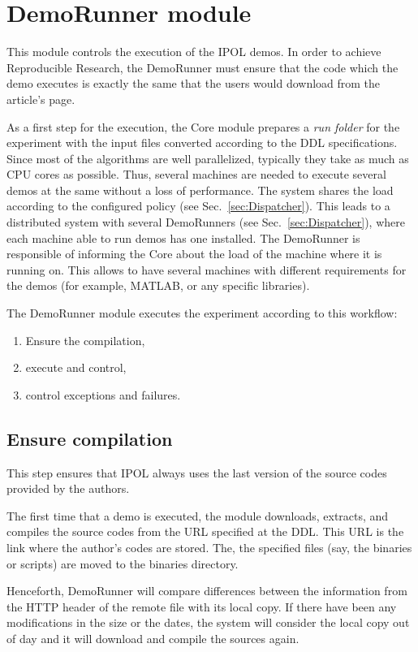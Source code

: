 \section{DemoRunner module}
\label{sec:DemoRunner}
This module controls the execution of the IPOL demos. In order to achieve Reproducible Research, the DemoRunner must ensure that the code which the demo executes is exactly the same that the users would download from the article's page.

As a first step for the execution, the Core module prepares a \emph{run folder} for the experiment with the input files converted according to the DDL specifications. Since most of the algorithms are well parallelized, typically they take as much as CPU cores as possible. Thus, several machines are needed to execute several demos at the same without a loss of performance. The system shares the load according to the configured policy (see Sec.~\ref{sec:Dispatcher}). This leads to a distributed system with several DemoRunners (see Sec.~\ref{sec:Dispatcher}), where each machine able to run demos has one installed. The DemoRunner is responsible of informing the Core about the load of the machine where it is running on. This allows to have several machines with different requirements for the demos (for example, MATLAB, or any specific libraries).

The DemoRunner module executes the experiment according to this workflow:

\begin{enumerate}
    \item Ensure the compilation,
    \item execute and control,
    \item control exceptions and failures. 
\end{enumerate}

\subsection{Ensure compilation}
\noindent

This step ensures that IPOL always uses the last version of the source codes provided by the authors. 

The first time that a demo is executed, the module downloads, extracts, and compiles the source codes from the URL specified at the DDL. This URL is the link where the author's codes are stored. The, the specified files (say, the binaries or scripts) are moved to the binaries directory.

Henceforth, DemoRunner will compare differences between the information from the HTTP header of the remote file with its local copy. If there have been any modifications in the size or the dates, the system will consider the local copy out of day and it will download and compile the sources again. 


